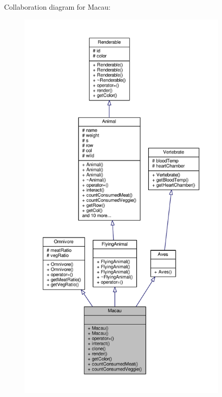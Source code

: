 Collaboration diagram for Macau\+:
\nopagebreak
\begin{figure}[H]
\begin{center}
\leavevmode
\includegraphics[height=550pt]{classMacau__coll__graph}
\end{center}
\end{figure}
